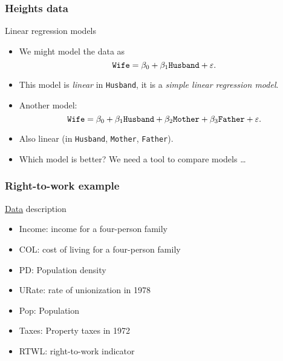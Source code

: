 \documentclass[handout]{beamer}
\newcommand{\B}[1]{\beta_{#1}}
\begin{document}

   \begin{frame} \frametitle{Heights data}

   \begin{block}
   {Linear regression models}
   \begin{itemize}

   \item We might model the data as
   $$
   {\tt Wife} = \B{0} + \B{1} {\tt Husband} + \varepsilon.
   $$

   \item This model is {\em linear} in {\tt Husband}, it is a
   {\em simple linear regression model}.

   \item Another model:
   $$
   {\tt Wife} = \B{0} + \B{1} {\tt Husband} + \B{2} {\tt Mother} + \B{3}
   {\tt Father} + \varepsilon.
   $$

   \item Also linear (in {\tt Husband}, {\tt Mother}, {\tt Father}).

   \item Which model is better? We need a tool to compare models \dots
   \end{itemize}
   \end{block}
   \end{frame}


   \begin{frame} \frametitle{Right-to-work example}

   \begin{block}
   {\href{http://www.ilr.cornell.edu/~hadi/RABE4/Data4/P005.txt}{Data} description}
   \begin{itemize}
   \item Income: income for a four-person family
   \item COL: cost of living for a four-person family
   \item PD: Population density
   \item URate: rate of unionization in 1978
   \item Pop: Population
   \item Taxes: Property taxes in 1972
   \item RTWL: right-to-work indicator
   \end{itemize}
   \end{block}
   \end{frame}
\end{document}
